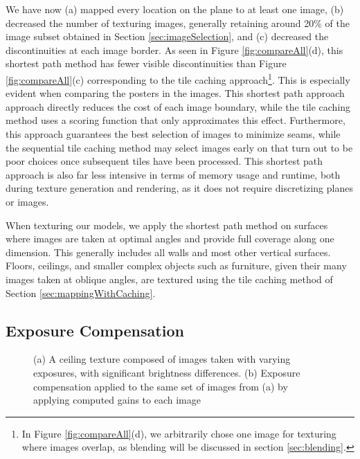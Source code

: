 \documentclass[]{spie}  %
\begin{document}
We have now (a) mapped every location on the plane to at least one
image, (b) decreased the number of texturing images, generally
retaining around 20\% of the image subset obtained in Section
\ref{sec:imageSelection}, and (c) decreased the discontinuities at
each image border. As seen in Figure \ref{fig:compareAll}(d), this
shortest path method has fewer visible discontinuities than Figure
\ref{fig:compareAll}(c) corresponding to the tile caching
approach\footnote{In Figure \ref{fig:compareAll}(d), we arbitrarily
  chose one image for texturing where images overlap, as blending will
  be discussed in section \ref{sec:blending}.}. This is especially
evident when comparing the posters in the images. This shortest path
approach approach directly reduces the cost of each image boundary,
while the tile caching method uses a scoring function that only
approximates this effect. Furthermore, this approach guarantees the
best selection of images to minimize seams, while the sequential tile
caching method may select images early on that turn out to be poor
choices once subsequent tiles have been processed. This shortest path
approach is also far less intensive in terms of memory usage and
runtime, both during texture generation and rendering, as it does not
require discretizing planes or images.

When texturing our models, we apply the shortest path method on
surfaces where images are taken at optimal angles and provide full
coverage along one dimension. This generally includes all walls and
most other vertical surfaces. Floors, ceilings, and smaller complex
objects such as furniture, given their many images taken at oblique
angles, are textured using the tile caching method of Section
\ref{sec:mappingWithCaching}.

\subsection{Exposure Compensation}
\label{sec:exposureCompensation}

\begin{figure}
  \centering {} \hspace{0.5in}
  \caption{(a) A ceiling texture composed of images taken with varying
    exposures, with significant brightness differences. (b) Exposure
    compensation applied to the same set of images from (a) by
    applying computed gains to each image}
  \label{fig:exposureDiff}
\end{figure}
\end{document}
